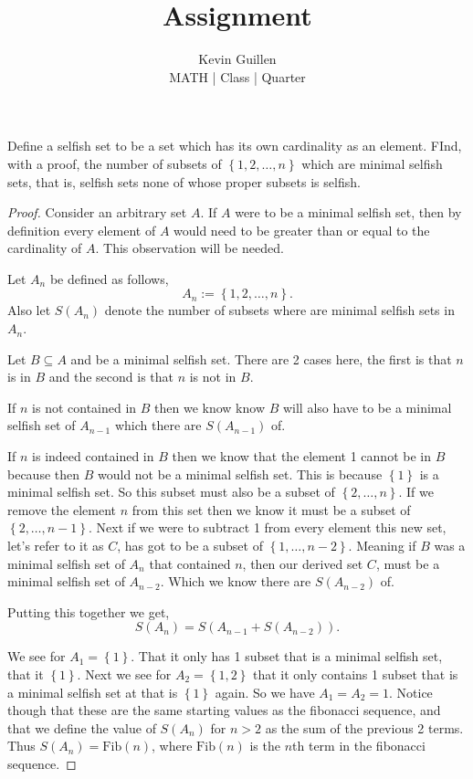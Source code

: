 \documentclass[11pt]{article}
\newenvironment{problem}[2][Problem\!]{\begin{trivlist}
\item[\hskip \labelsep {\bfseries #1}\hskip \labelsep {\bfseries #2}]}{\end{trivlist}}
\newcommand{\set}[1]{\left\{#1\right\}} %
\begin{document}
 
\title{Assignment}
\author{Kevin Guillen\\[0.5em]
MATH  | Class | Quarter}
\date{} 
\maketitle


\begin{tcolorbox}
    \begin{problem}{ IC | 11/05 | 124 (Putnam)}
        Define a selfish set to be a set which has its own cardinality as an element. FInd, with a proof, the number of subsets of $\set{1,2,\dots, n}$ which are minimal selfish sets, that is, selfish sets none of whose proper subsets is selfish. 
    \end{problem}
\end{tcolorbox}
\begin{proof}
    Consider an arbitrary set $A$. If $A$ were to be a minimal selfish set, then by definition every element of $A$ would need to be greater than or equal to the cardinality of $A$. This observation will be needed. 

    Let $A_n$ be defined as follows,
    \[A_n := \set{1,2,\dots, n}.\]
    Also let $S(A_n)$ denote the number of subsets where are minimal selfish sets in $A_n$.


    Let $B \subseteq A$ and be a minimal selfish set. There are 2 cases here, the first is that $n$ is in $B$ and the second is that $n$ is not in $B$.
    
    If $n$ is not contained in $B$ then we know know $B$ will also have to be a minimal selfish set of $A_{n-1}$ which there are $S(A_{n-1})$ of. 

    If $n$ is indeed contained in $B$ then we know that the element 1 cannot be in $B$ because then $B$ would not be a minimal selfish set. This is because $\set{1}$ is a minimal selfish set. So this subset must also be a subset of $\set{2, \dots, n}$. If we remove the element $n$ from this set then we know it must be a subset of $\set{2, \dots, n-1}$. Next if we were to subtract 1 from every element this new set, let's refer to it as $C$, has got to be a subset of $\set{1,\dots,n-2}$. Meaning if $B$ was a minimal selfish set of $A_n$ that contained $n$, then our derived set $C$, must be a minimal selfish set of $A_{n-2}$. Which we know there are $S(A_{n-2})$ of. 
    
    Putting this together we get,
    \[S(A_n) = S(A_{n-1} + S(A_{n-2})).\]

    We see for $A_1 = \set{1}$. That it only has 1 subset that is a minimal selfish set, that it $\set{1}$. Next we see for $A_2 = \set{1,2}$ that it only contains 1 subset that is a minimal selfish set at that is $\set{1}$ again. So we have $A_1 = A_2 = 1$. Notice though that these are the same starting values as the fibonacci sequence, and that we define the value of $S(A_n)$ for $n > 2$ as the sum of the previous 2 terms. Thus $S(A_n) = \text{Fib}(n)$, where $\text{Fib}(n)$ is the $n$th term in the fibonacci sequence. 
\end{proof}
\end{document}
